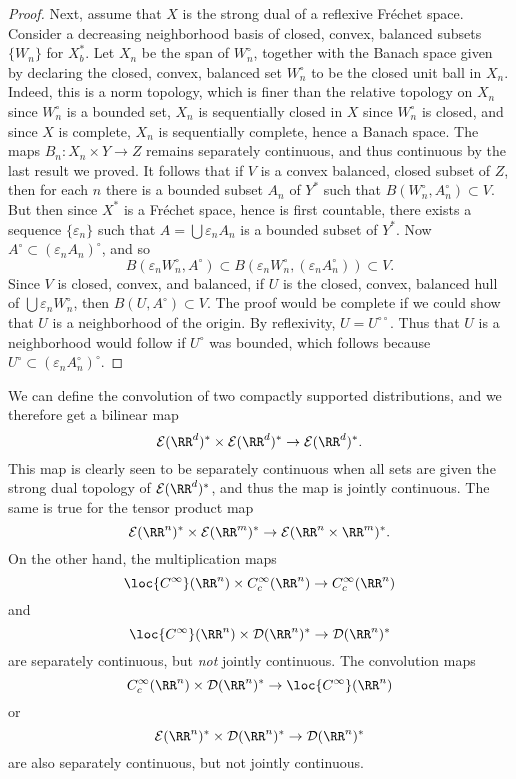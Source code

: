 \begin{proof}
    Next, assume that $X$ is the strong dual of a reflexive Fr\'{e}chet space. Consider a decreasing neighborhood basis of closed, convex, balanced subsets $\{ W_n \}$ for $X^*_b$. Let $X_n$ be the span of $W_n^\circ$, together with the Banach space given by declaring the closed, convex, balanced set $W_n^\circ$ to be the closed unit ball in $X_n$. Indeed, this is a norm topology, which is finer than the relative topology on $X_n$ since $W_n^\circ$ is a bounded set, $X_n$ is sequentially closed in $X$ since $W_n^\circ$ is closed, and since $X$ is complete, $X_n$ is sequentially complete, hence a Banach space. The maps $B_n: X_n \times Y \to Z$ remains separately continuous, and thus continuous by the last result we proved. It follows that if $V$ is a convex balanced, closed subset of $Z$, then for each $n$ there is a bounded subset $A_n$ of $Y^*$ such that $B(W_n^\circ, A_n^\circ) \subset V$. But then since $X^*$ is a Fr\'{e}chet space, hence is first countable, there exists a sequence $\{ \varepsilon_n \}$ such that $A = \bigcup \varepsilon_n A_n$ is a bounded subset of $Y^*$. Now $A^\circ \subset (\varepsilon_n A_n)^\circ$, and so
    \[ B(\varepsilon_n W_n^\circ, A^\circ) \subset B(\varepsilon_n W_n^\circ, (\varepsilon_n A_n^\circ)) \subset V. \]
    Since $V$ is closed, convex, and balanced, if $U$ is the closed, convex, balanced hull of $\bigcup \varepsilon_n W_n^\circ$, then $B(U,A^\circ) \subset V$. The proof would be complete if we could show that $U$ is a neighborhood of the origin. By reflexivity, $U = U^{\circ \circ}$. Thus that $U$ is a neighborhood would follow if $U^\circ$ was bounded, which follows because $U^\circ \subset (\varepsilon_n A_n^\circ)^\circ$.
\end{proof}

\begin{example}
    We can define the convolution of two compactly supported distributions, and we therefore get a bilinear map
    \[ \mathcal{E}(\RR^d)^* \times \mathcal{E}(\RR^d)^* \to \mathcal{E}(\RR^d)^*. \]
    This map is clearly seen to be separately continuous when all sets are given the strong dual topology of $\mathcal{E}(\RR^d)^*$, and thus the map is jointly continuous. The same is true for the tensor product map
    \[ \mathcal{E}(\RR^n)^* \times \mathcal{E}(\RR^m)^* \to \mathcal{E}(\RR^n \times \RR^m)^*. \]
    On the other hand, the multiplication maps
    \[ \loc{C^\infty}(\RR^n) \times C_c^\infty(\RR^n) \to C_c^\infty(\RR^n) \]
    and 
    \[ \loc{C^\infty}(\RR^n) \times \mathcal{D}(\RR^n)^* \to \mathcal{D}(\RR^n)^* \]
    are separately continuous, but \emph{not} jointly continuous. The convolution maps
    \[ C_c^\infty(\RR^n) \times \mathcal{D}(\RR^n)^* \to \loc{C^\infty}(\RR^n) \]
    or
    \[ \mathcal{E}(\RR^n)^* \times \mathcal{D}(\RR^n)^* \to \mathcal{D}(\RR^n)^* \]
    are also separately continuous, but not jointly continuous.
\end{example}

